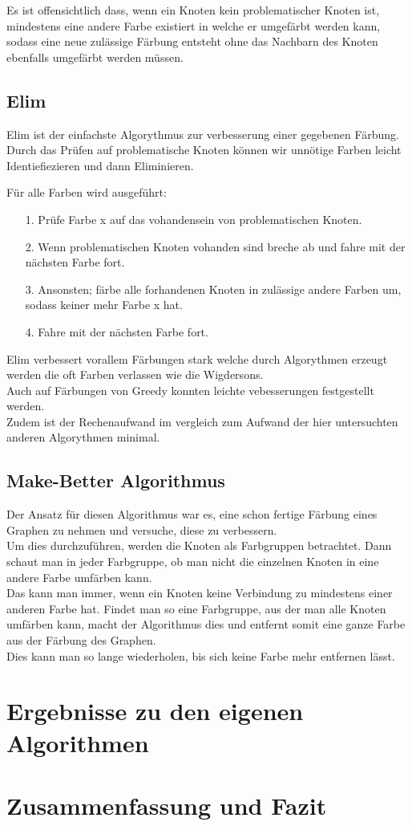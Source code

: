 \documentclass[11pt]{article}
\begin{document}
Es ist offensichtlich dass, wenn ein Knoten kein problematischer Knoten ist, mindestens eine andere Farbe existiert in welche er umgefärbt werden kann, \\
sodass eine neue zulässige Färbung entsteht ohne das Nachbarn des Knoten ebenfalls umgefärbt werden müssen.

\subsection{Elim}
Elim ist der einfachste Algorythmus zur verbesserung einer gegebenen Färbung. \\

Durch das Prüfen auf problematische Knoten können wir unnötige Farben leicht Identiefiezieren und dann Eliminieren.

Für alle Farben wird ausgeführt: \\
\begin{itemize}
\item[1.] Prüfe Farbe x auf das vohandensein von problematischen Knoten.
\item[2.] Wenn problematischen Knoten vohanden sind breche ab und fahre mit der nächsten Farbe fort.
\item[3.] Ansonsten; färbe alle forhandenen Knoten in zulässige andere Farben um, sodass keiner mehr Farbe x hat.
\item[4.] Fahre mit der nächsten Farbe fort.
\end{itemize}

Elim verbessert vorallem Färbungen stark welche durch Algorythmen erzeugt werden die oft Farben verlassen wie die Wigdersons. \\
Auch auf Färbungen von Greedy konnten leichte vebesserungen festgestellt werden. \\
Zudem ist der Rechenaufwand im vergleich zum Aufwand der hier untersuchten anderen Algorythmen minimal.

\subsection{Make-Better Algorithmus}

Der Ansatz für diesen Algorithmus war es, eine schon fertige Färbung eines Graphen zu nehmen und versuche, diese zu verbessern. \\
Um dies durchzuführen, werden die Knoten als Farbgruppen betrachtet. Dann schaut man in jeder Farbgruppe, ob man nicht die einzelnen Knoten in eine andere Farbe umfärben kann. \\
Das kann man immer, wenn ein Knoten keine Verbindung zu mindestens einer anderen Farbe hat. Findet man so eine Farbgruppe, aus der man alle Knoten umfärben kann, 
macht der Algorithmus dies und entfernt somit eine ganze Farbe aus der Färbung des Graphen. \\
Dies kann man so lange wiederholen, bis sich keine Farbe mehr entfernen lässt.

\section{Ergebnisse zu den eigenen Algorithmen} %
\section{Zusammenfassung und Fazit} %



\end{document}

